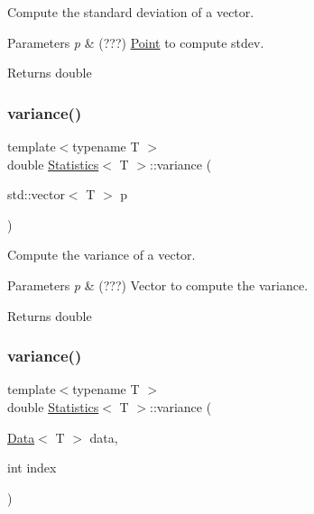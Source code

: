 Compute the standard deviation of a vector. 


\begin{DoxyParams}{Parameters}
{\em p} & (???) \hyperlink{class_point}{Point} to compute stdev. \\
\hline
\end{DoxyParams}
\begin{DoxyReturn}{Returns}
double 
\end{DoxyReturn}
\mbox{\label{class_statistics_a9e5a038712e910978ee5c6dd3c16d0ee}} 
\subsubsection{\texorpdfstring{variance()}{variance()}\hspace{0.1cm}{\footnotesize\ttfamily [1/2]}}
{\footnotesize\ttfamily template$<$typename T $>$ \\
double \hyperlink{class_statistics}{Statistics}$<$ T $>$\+::variance (\begin{DoxyParamCaption}\item[{std\+::vector$<$ T $>$}]{p }\end{DoxyParamCaption})\hspace{0.3cm}{\ttfamily [static]}}



Compute the variance of a vector. 


\begin{DoxyParams}{Parameters}
{\em p} & (???) Vector to compute the variance. \\
\hline
\end{DoxyParams}
\begin{DoxyReturn}{Returns}
double 
\end{DoxyReturn}
\mbox{\label{class_statistics_a02f605eec578754e63de82acce5a3f34}} 
\subsubsection{\texorpdfstring{variance()}{variance()}\hspace{0.1cm}{\footnotesize\ttfamily [2/2]}}
{\footnotesize\ttfamily template$<$typename T $>$ \\
double \hyperlink{class_statistics}{Statistics}$<$ T $>$\+::variance (\begin{DoxyParamCaption}\item[{\hyperlink{class_data}{Data}$<$ T $>$}]{data,  }\item[{int}]{index }\end{DoxyParamCaption})\hspace{0.3cm}{\ttfamily [static]}}



